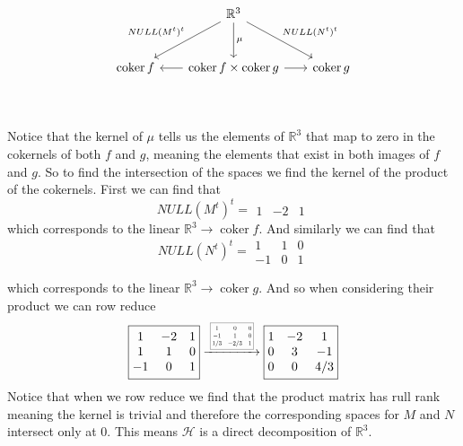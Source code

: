\documentclass[12pt]{amsart}
\theoremstyle{definition}
\newcommand{\R}{\mathbb{R}}
\DeclareMathOperator{\coker}{\mathrm{coker}}
\newcommand{\ra}{\rightarrow}
\begin{document}
\begin{enumerate}
\[\begin{tikzcd}[row sep=1cm, column sep=.65cm]
     &\R^3\arrow[dl, "NULL(M^t)^t"']\arrow[dr, "NULL(N^t)^t"]\arrow[d,"\mu"]&\\
     \coker f& \coker f \times \coker g\arrow[l]\arrow[r] & \coker g\\
    \end{tikzcd}\]

    Notice that the kernel of $\mu$ tells us the elements of $\R^3$ that map to zero in the cokernels of both $f$ and $g$, meaning the elements that exist in both images of $f$ and $g$. So to find the intersection of the spaces we find the kernel of the product of the cokernels. First we can find that
    $$NULL(M^t)^t=\boxed{\begin{matrix}
    1 & -2 & 1
\end{matrix}}$$
which corresponds to the linear $\R^3\ra \coker f$. And similarly we can find that
    $$NULL(N^t)^t=\boxed{\begin{matrix}
    1 & 1 & 0\\
    -1 & 0 & 1
\end{matrix}}$$

which corresponds to the linear $\R^3\ra \coker g$. And so when considering their product we can row reduce
$$\boxed{\begin{matrix}
    1 & -2 & 1\\
    1 & 1 & 0\\
    -1 & 0 & 1
\end{matrix}}
\xrightarrow{\scalebox{0.5}{\;
\boxed{\begin{matrix}
    1 & 0 & 0\\
    -1 & 1 & 0\\
    1/3 & -2/3 & 1
\end{matrix}}\;}}
\boxed{\begin{matrix}
    1 & -2 & 1\\
    0 & 3 & -1\\
    0 & 0 & 4/3
\end{matrix}}$$
Notice that when we row reduce we find that the product matrix has rull rank meaning the kernel is trivial and therefore the corresponding spaces for $M$ and $N$ intersect only at $0$. This means $\mathcal{H}$ is a direct decomposition of $\R^3$.\\


\end{enumerate}
\end{document}
